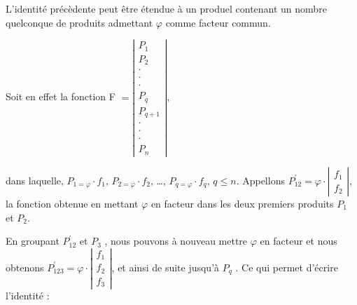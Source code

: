 L'identité précèdente peut être étendue à un produel contenant un
nombre quelconque de produits admettant \og  $\varphi$ \fg{} comme
facteur commun.

\medskip

Soit en effet la fonction F $=\left|\begin{array}{l}
P_{1}\\
P_{2}\\
\cdot\\
\cdot\\
\cdot\\
P_{q}\\
P_{q+1}\\
\cdot\\
\cdot\\
\cdot\\
P_{n}
\end{array}\right|$,

\medskip

dans laquelle, $P_{1=\varphi}\cdot f_{1}$, $P_{2=\varphi}\cdot f_{2}$,
\dots , $P_{q=\varphi}\cdot f_{q}$, $q\leq n$. Appellons $P_{12}^{'}=\varphi\cdot\left|\begin{array}{c}
f_{1}\\
f_{2}
\end{array}\right|$, la fonction obtenue en mettant \og $\varphi$ \fg{} en facteur
dans les deux premiers produits $P_{1}$ et $P_{2}$.

En groupant \og  $P_{12}^{'}$ \fg{} et \og $P_{3}$ \fg{}, nous
pouvons à nouveau mettre \og $\varphi$ \fg{} en facteur et nous
obtenons $P_{123}^{'}=\varphi\cdot\left|\begin{array}{c}
f_{1}\\
f_{2}\\
f_{3}
\end{array}\right|$, et ainsi de suite jusqu'à \og $P_{q}$ \fg{}. Ce qui permet d'écrire
l'identité :

